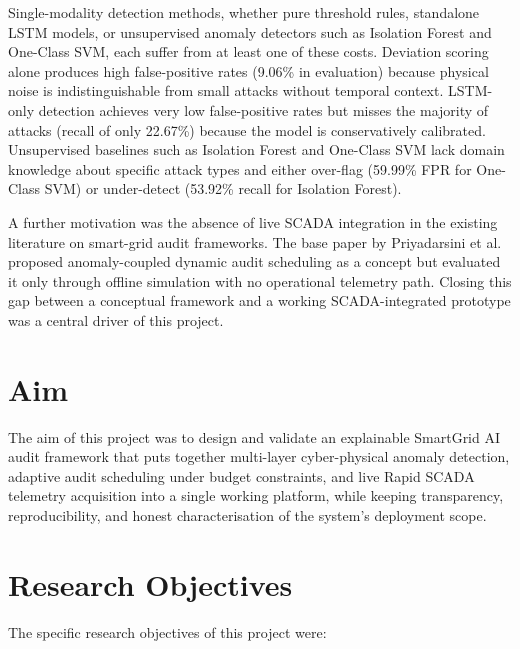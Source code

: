 Single-modality detection methods, whether pure threshold rules, standalone LSTM models, or unsupervised anomaly detectors such as Isolation Forest and One-Class SVM, each suffer from at least one of these costs. Deviation scoring alone produces high false-positive rates (9.06\% in evaluation) because physical noise is indistinguishable from small attacks without temporal context. LSTM-only detection achieves very low false-positive rates but misses the majority of attacks (recall of only 22.67\%) because the model is conservatively calibrated. Unsupervised baselines such as Isolation Forest and One-Class SVM lack domain knowledge about specific attack types and either over-flag (59.99\% FPR for One-Class SVM) or under-detect (53.92\% recall for Isolation Forest).

A further motivation was the absence of live SCADA integration in the existing literature on smart-grid audit frameworks. The base paper by Priyadarsini et al. \cite{priyadarsini2025enhancing} proposed anomaly-coupled dynamic audit scheduling as a concept but evaluated it only through offline simulation with no operational telemetry path. Closing this gap between a conceptual framework and a working SCADA-integrated prototype was a central driver of this project.


\section{Aim}

The aim of this project was to design and validate an explainable SmartGrid AI audit framework that puts together multi-layer cyber-physical anomaly detection, adaptive audit scheduling under budget constraints, and live Rapid SCADA telemetry acquisition into a single working platform, while keeping transparency, reproducibility, and honest characterisation of the system's deployment scope.


\section{Research Objectives}

The specific research objectives of this project were:

